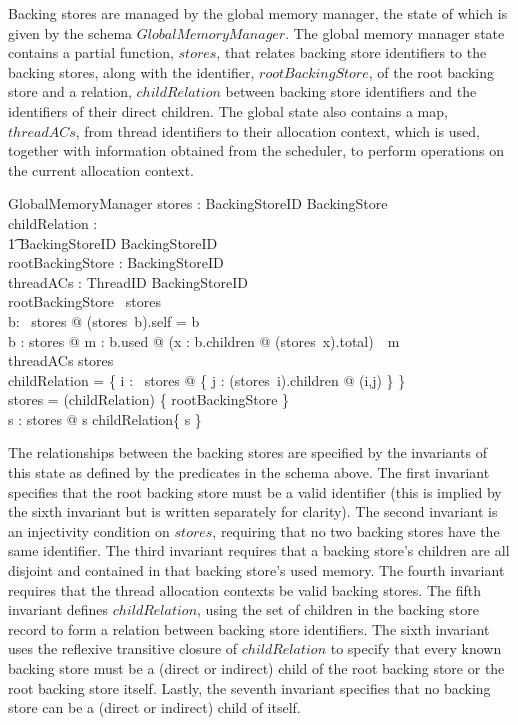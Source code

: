 \documentclass[a4paper,10pt]{report}
\begin{document}
Backing stores are managed by the global memory manager, the state of
which is given by the schema $GlobalMemoryManager$.
The global memory manager state contains a partial function, $stores$,
that relates backing store identifiers to the backing stores, along
with the identifier, $rootBackingStore$, of the root backing store and
a relation, $childRelation$ between backing store identifiers and the
identifiers of their direct children.
The global state also contains a map, $threadACs$, from thread
identifiers to their allocation context, which is used, together with
information obtained from the scheduler, to perform operations on the
current allocation context.
%
\begin{schema}{GlobalMemoryManager}
  stores : BackingStoreID \pfun BackingStore \\
  childRelation : \\
  \t1 BackingStoreID \rel BackingStoreID \\
  rootBackingStore : BackingStoreID \\
  threadACs : ThreadID \pfun BackingStoreID \\
  \where
  rootBackingStore \in \dom~stores \\
  \forall b: \dom~stores @ (stores~b).self = b \\
  \forall b : \ran stores @ \exists m : \power b.used @
  (\lambda x : b.children @ (stores~x).total)~\partition~m \\
  \ran threadACs \subseteq \dom stores \\
  childRelation = \bigcup \{ i : \dom~stores @ \{ j : (stores~i).children @ (i,j) \} \} \\
  \dom stores = (childRelation\star) \limg \{ rootBackingStore \} \rimg \\
  \forall s : \dom stores @ s \notin childRelation\plus \limg \{ s \} \rimg \\
\end{schema}
%
The relationships between the backing stores are specified by the
invariants of this state as defined by the predicates in the schema
above.
The first invariant specifies that the root backing store must be a
valid identifier (this is implied by the sixth invariant but is
written separately for clarity).
The second invariant is an injectivity condition on $stores$,
requiring that no two backing stores have the same identifier.
The third invariant requires that a backing store's children are all
disjoint and contained in that backing store's used memory.
The fourth invariant requires that the thread allocation contexts be
valid backing stores.
The fifth invariant defines $childRelation$, using the set of children
in the backing store record to form a relation between backing store
identifiers.
The sixth invariant uses the reflexive transitive closure of
$childRelation$ to specify that every known backing store must be a
(direct or indirect) child of the root backing store or the root
backing store itself.
Lastly, the seventh invariant specifies that no backing store can be a
(direct or indirect) child of itself.
\end{document}
